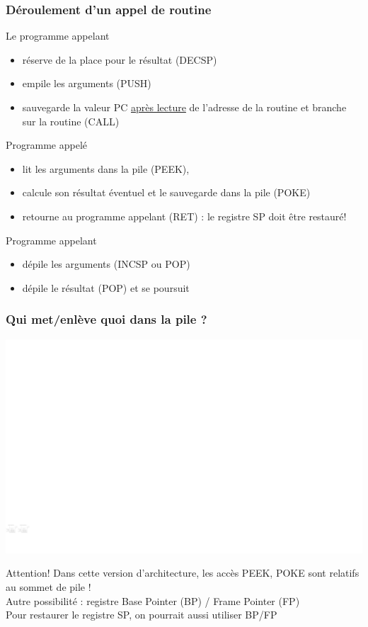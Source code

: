 \documentclass{beamer}
\begin{document}
\begin{frame}
\frametitle{Déroulement d'un appel de routine}

\begin{small}
Le programme appelant
\begin{itemize}
\item réserve de la place pour le résultat (DECSP)
\item empile les arguments (PUSH)
\item sauvegarde la valeur PC \underline{après lecture} de l'adresse de la routine et branche sur la routine (CALL)
\end{itemize}

Programme appelé
\begin{itemize}
\item lit les arguments dans la pile (PEEK), 
\item calcule son résultat éventuel et le sauvegarde dans la pile (POKE)
\item retourne au programme appelant (RET) : le registre SP doit être restauré!
\end{itemize}

Programme appelant
\begin{itemize}
\item dépile les arguments (INCSP ou POP)
\item dépile le résultat (POP) et se poursuit
\end{itemize}
\end{small}

\end{frame}

\begin{frame}
\frametitle{Qui met/enlève quoi dans la pile ?}

\centering\includegraphics[width=\linewidth]{Figs/respo_pile.pdf}

\begin{block}{Attention!}
Dans cette version d'architecture, les accès PEEK, POKE sont relatifs au sommet de pile !\\
Autre possibilité : registre Base Pointer (BP) / Frame Pointer (FP)\\
Pour restaurer le registre SP, on pourrait aussi utiliser BP/FP
\end{block}

\end{frame}
\end{document}
